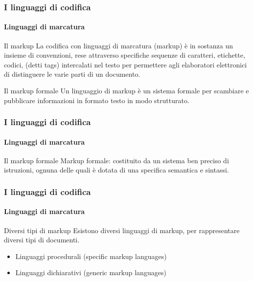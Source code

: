 \documentclass{beamer}
\begin{document}
\begin{frame}
	\frametitle{I linguaggi di codifica}
	\framesubtitle{Linguaggi di marcatura}
	\addtocounter{nframe}{1}

	\begin{block}{Il markup}
		La codifica con linguaggi di marcatura (markup) è in sostanza un insieme di convenzioni, rese attraverso specifiche sequenze di caratteri, etichette, codici, (detti tags) intercalati nel testo per permettere agli elaboratori elettronici di distinguere le varie parti di un documento.
	\end{block}

	\begin{block}{Il markup formale}
		Un linguaggio di markup è un sistema formale per scambiare e pubblicare informazioni in formato testo in modo strutturato.
	\end{block}


\end{frame}

\begin{frame}
	\frametitle{I linguaggi di codifica}
	\framesubtitle{Linguaggi di marcatura}
	\addtocounter{nframe}{1}

	\begin{block}{Il markup formale}
		Markup formale: costituito da un sistema ben preciso di istruzioni, ognuna delle quali è dotata di una specifica semantica e sintassi.
	\end{block}


\end{frame}

\begin{frame}
	\frametitle{I linguaggi di codifica}
	\framesubtitle{Linguaggi di marcatura}
	\addtocounter{nframe}{1}

	\begin{block}{Diversi tipi di markup}
		Esistono diversi linguaggi di markup, per rappresentare diversi tipi di documenti.
		\begin{itemize}
			\item Linguaggi procedurali (specific markup languages)
			\item Linguaggi dichiarativi (generic markup languages)
		\end{itemize}
	\end{block}
\end{frame}
\end{document}
